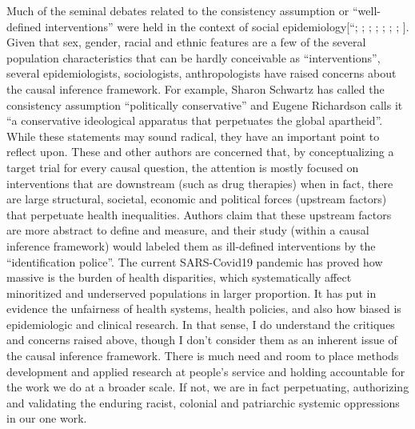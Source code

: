 \documentclass[
]{book}
\begin{document}
Much of the seminal debates related to the consistency assumption or ``well-defined interventions'' were held in the context of social epidemiology{[}``\textcite{vanderweele2014}; \textcite{glymour2014}; \textcite{kaufman2014}; \textcite{glymour2017}; \textcite{vandenbroucke2016}; \textcite{krieger2016}; \textcite{robinson2019}; \textcite{jackson2020}{]}. Given that sex, gender, racial and ethnic features are a few of the several population characteristics that can be hardly conceivable as ``interventions'', several epidemiologists, sociologists, anthropologists have raised concerns about the causal inference framework. For example, Sharon Schwartz has called the consistency assumption ``politically conservative''\autocite{schwartz2016} and Eugene Richardson calls it ``a conservative ideological apparatus that perpetuates the global apartheid''\autocite{epidemicIllusions}. While these statements may sound radical, they have an important point to reflect upon. These and other authors are concerned that, by conceptualizing a target trial for every causal question, the attention is mostly focused on interventions that are downstream (such as drug therapies) when in fact, there are large structural, societal, economic and political forces (upstream factors) that perpetuate health inequalities\autocite{krieger2008}. Authors claim that these upstream factors are more abstract to define and measure, and their study (within a causal inference framework) would labeled them as ill-defined interventions by the ``identification police''\autocite{ruhm2018}.
The current SARS-Covid19 pandemic has proved how massive is the burden of health disparities, which systematically affect minoritized and underserved populations in larger proportion. It has put in evidence the unfairness of health systems, health policies, and also how biased is epidemiologic and clinical research\autocite{bailey2021,krieger2021,abimbola2021,bayingana2021}. In that sense, I do understand the critiques and concerns raised above, though I don't consider them as an inherent issue of the causal inference framework. There is much need and room to place methods development and applied research at people's service and holding accountable for the work we do at a broader scale. If not, we are in fact perpetuating, authorizing and validating the enduring racist, colonial and patriarchic systemic oppressions in our one work.
\end{document}
